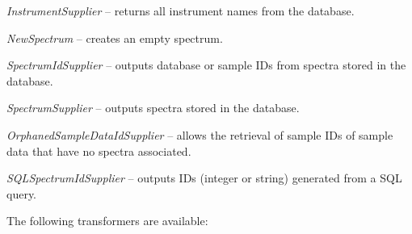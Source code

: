 \documentclass[a4paper]{book}
\begin{document}
\begin{tight_itemize}
  \item \textit{InstrumentSupplier} -- returns all instrument names from the
  database.
  \item \textit{NewSpectrum} -- creates an empty spectrum.
  \item \textit{SpectrumIdSupplier} -- outputs database or sample IDs from spectra
  stored in the database.
  \item \textit{SpectrumSupplier} -- outputs spectra stored in the database.
  \item \textit{OrphanedSampleDataIdSupplier} -- allows the retrieval of sample
  IDs of sample data that have no spectra associated.
  \item \textit{SQLSpectrumIdSupplier} -- outputs IDs (integer or string)
  generated from a SQL query.
\end{tight_itemize}
The following transformers are available:
\end{document}
